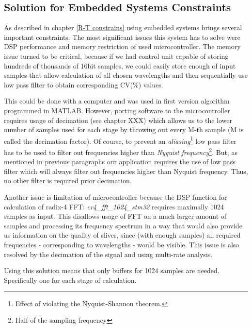 \documentclass[twoside]{ctuthesis}
\theoremstyle{plain}
\theoremstyle{definition}
\theoremstyle{note}
\begin{document}
\subsection{Solution for Embedded Systems Constraints}
\label{sec:SolutionForEmbedded}
As described in chapter \ref{R-T constrains} using embedded systems brings several important constraints. The most significant issues this system has to solve were DSP performance and memory restriction of used microcontroller. The memory issue turned to be critical, because if we had control unit capable of storing hundreds of thousands of 16bit samples, we could easily store enough of input samples that allow calculation of all chosen wavelengths and then sequentially use low pass filter to obtain corresponding CV(\%) values. 

This could be done with a computer and was used in first version algorithm programmed in MATLAB. However, porting software to the microcontroller requires usage of decimation (see chapter XXX) which allows us to the lower number of samples used for each stage by throwing out every M-th sample (M is called the decimation factor). Of course, to prevent an \textit{aliasing}\footnote{Effect of violating the Nyquist-Shannon theorem.} low pass filter has to be used to filter out frequencies higher than \textit{Nyquist frequency}\footnote{Half of the sampling frequency}. But, as mentioned in previous paragraphs our application requires the use of low pass filter which will always filter out frequencies higher than Nyquist frequency. Thus, no other filter is required prior decimation.

Another issue is limitation of microcontroller because the DSP function for calculation of radix-4 FFT: \textit{cr4\_fft\_1024\_stm32} requires maximally 1024 samples as input. This disallows usage of FFT on a much larger amount of samples and processing its frequency spectrum in a way that would also provide us information on the quality of sliver, since (with enough samples) all required frequencies - corresponding to wavelengths - would be visible. This issue is also resolved by the decimation of the signal and using multi-rate analysis. 

Using this solution means that only buffers for 1024 samples are needed. Specifically one for each stage of calculation.
\end{document}
